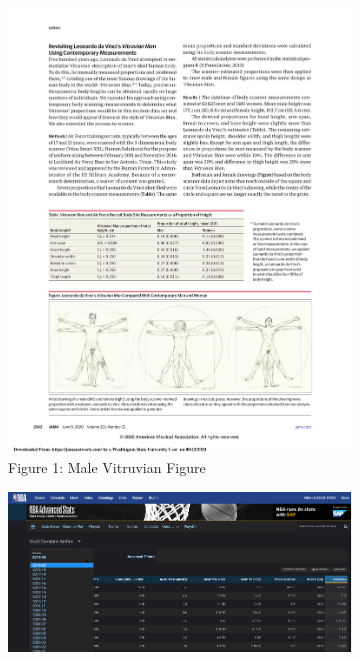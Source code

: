 \documentclass[]{article}
\begin{document}
\begin{figure}[!ht]
    \begin{subfigure}[h]{0.4\textwidth}
    \centering
            \includegraphics[trim = 0 0 11.25cm 0,clip,scale=1]{figures/Vitruvian.pdf}
        \caption{Figure 1: Male Vitruvian Figure }
        \label{fig:sub-first}
    \end{subfigure}
    \begin{subfigure}[h]{0.4\textwidth}
    \centering
        \includegraphics[trim =  0 0.5cm 4.0cm 0,clip,scale=1]{figures/nba.png}

\end{subfigure}
\end{figure}
\end{document}
